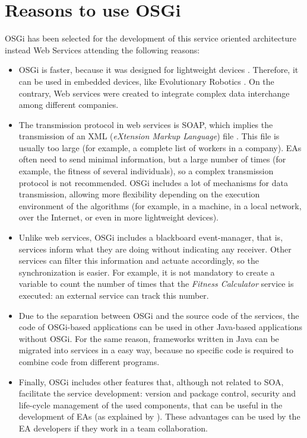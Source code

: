 \section{Reasons to use OSGi}
OSGi has been selected for the development of this service oriented architecture instead Web Services  attending the following reasons:

\begin{itemize}

\item OSGi is faster, because it was designed for
  lightweight devices \cite{LimGateway08}. Therefore, it can be
  used in embedded devices, like Evolutionary Robotics
  \cite{Garcia2012testing}. On the contrary, Web services were created to integrate complex
  data interchange among different companies.  
\item The transmission protocol in web services is SOAP, which implies
  the transmission of an XML ({\em eXtension Markup
    Language}) file \cite{XML}. This file is usually too large (for example, a
  complete list of workers in a company). 
 EAs often need to send
  minimal information, but a large number of times (for example, the
  fitness of several individuals), so a complex transmission protocol
  is not recommended. OSGi includes a lot of mechanisms for data
  transmission, allowing more flexibility depending on the execution environment of
  the algorithms (for example, in a machine, in a local
  network, over the Internet, or even in more lightweight devices). 

 \item Unlike web services, OSGi includes a blackboard event-manager,
   that is, services inform what they are doing without indicating 
 any receiver. Other services can filter this information and actuate
 accordingly, so the synchronization is easier. For example, it is not
 mandatory to create a variable to count the number of times that the
 {\em Fitness Calculator} service is executed: an external service can track this number. 
 \item Due to the separation between OSGi and the source code of the
   services, the code of OSGi-based applications can be used in other
   Java-based applications without OSGi. For the same reason,
   frameworks written in Java can be migrated into services in a easy
   way, because no specific code is required to combine code from different programs. 
 \item Finally, OSGi includes other features that, although not related to SOA, facilitate the service development: version and package
   control, security and life-cycle management of the used
   components, that can be useful in the development of EAs 
   (as explained by  \cite{WagnerPlugins07}). These advantages can be used by the EA developers if
   they work in a team collaboration. 
\end{itemize}

